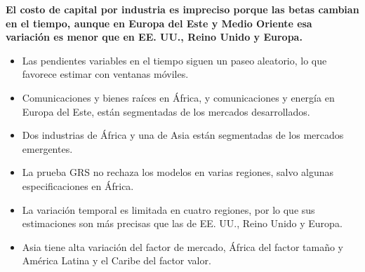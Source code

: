 \documentclass{article}
\newcommand{\bodysize}{\fontsize{26}{34.3}\selectfont}
\newcommand{\cardtitlesize}{\fontsize{30.7}{36.8}\selectfont}
\newcommand{\smallsize}{\fontsize{21.3}{27.7}\selectfont}
\newcommand{\cardtitle}[2][navy]{{\color{#1}\cardtitlesize\bfseries\textls[110]{\MakeUppercase{#2}}}\par\vspace{7mm}}
\begin{document}
\vfill
\hspace*{34mm}\begin{minipage}{773mm}
\begin{tcolorbox}[card=teal]\cardtitle[teal]{Resultados}
\begin{tcolorbox}[enhanced, sharp corners, colback=tealSoft, boxrule=0pt, left=14mm, right=14mm, top=10mm, bottom=11mm,
  borderline west={4mm}{0mm}{teal}, fontupper=\bodysize\color{ink}\raggedright]
{\color{teal}\smallsize\bfseries{}}\par\vspace{4mm}
{\bfseries El costo de capital por industria es impreciso porque las betas cambian en el tiempo, aunque en Europa del Este y Medio Oriente esa variación es menor que en EE. UU., Reino Unido y Europa.}
\end{tcolorbox}
\vspace{11mm}
\begin{minipage}[t]{0.48\linewidth}
\begin{itemize}
\item Las pendientes variables en el tiempo siguen un paseo aleatorio, lo que favorece estimar con ventanas móviles.
\item Comunicaciones y bienes raíces en África, y comunicaciones y energía en Europa del Este, están segmentadas de los mercados desarrollados.
\item Dos industrias de África y una de Asia están segmentadas de los mercados emergentes.
\end{itemize}
\end{minipage}\hfill
\begin{minipage}[t]{0.48\linewidth}
\begin{itemize}
\item La prueba GRS no rechaza los modelos en varias regiones, salvo algunas especificaciones en África.
\item La variación temporal es limitada en cuatro regiones, por lo que sus estimaciones son más precisas que las de EE. UU., Reino Unido y Europa.
\item Asia tiene alta variación del factor de mercado, África del factor tamaño y América Latina y el Caribe del factor valor.
\end{itemize}
\end{minipage}
\end{tcolorbox}
\end{minipage}
\end{document}

